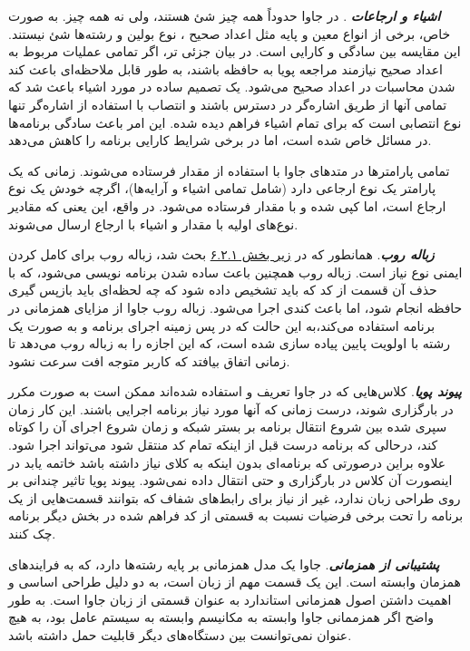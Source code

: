 \documentclass[a4paper,12pt]{report}
\begin{document}
	\textbf{\textit{
	اشیاء و ارجاعات
}}. در جاوا حدوداً همه چیز شئ هستند، ولی نه همه چیز. به صورت خاص، برخی از انواع معین و پایه مثل اعداد صحیح
، نوع بولین
 و رشته‌ها شئ نیستند. این مقایسه بین سادگی و کارایی است. در بیان جزئی تر، اگر تمامی عملیات مربوط به اعداد صحیح نیازمند مراجعه پویا به حافظه باشند، به طور قابل ملاحظه‌ای باعث کند شدن محاسبات در اعداد صحیح می‌شود. یک تصمیم ساده در مورد اشیاء باعث شد که تمامی آنها از طریق اشاره‌گر در دسترس باشند و انتصاب با استفاده از اشاره‌گر تنها نوع انتصابی است که برای تمام اشیاء فراهم دیده شده. این امر باعث سادگی برنامه‌ها در مسائل خاص شده است، اما در برخی شرایط کارایی برنامه را کاهش می‌دهد.

تمامی پارامترها در متدهای جاوا با استفاده از مقدار فرستاده می‌شوند. زمانی که یک پارامتر یک نوع ارجاعی دارد (شامل تمامی اشیاء و آرایه‌ها)، اگرچه خودش یک نوع ارجاع است، اما کپی شده و با مقدار فرستاده می‌شود. در واقع، این یعنی که مقادیر نوع‌های اولیه با مقدار و اشیاء با ارجاع ارسال می‌شوند.
	
	
	\textbf{\textit{
	زباله روب}}. همانطور که در 
	\hyperref[subsec1:sec2:chap6]{
	زیر بخش ۶.۲.۱} بحث شد، زباله روب برای کامل کردن ایمنی نوع  نیاز است. زباله روب همچنین باعث ساده شدن برنامه نویسی می‌شود، که با حذف آن قسمت از کد که باید تشخیص داده شود که چه لحظه‌ای باید بازپس گیری حافظه انجام شود، اما باعث کندی اجرا می‌شود. 
	زباله روب جاوا از مزایای همزمانی در برنامه استفاده می‌کند،‌به این حالت که در پس زمینه اجرای برنامه و به صورت یک رشته با اولویت پایین پیاده سازی شده است، که این اجازه را به زباله روب می‌دهد تا زمانی اتفاق بیافتد که کاربر متوجه افت سرعت نشود.
	
	\textbf{\textit{
	پیوند پویا}}. 
	کلاس‌هایی که در جاوا تعریف و استفاده شده‌اند ممکن است به صورت مکرر در 
	بارگزاری شوند،‌ درست زمانی که آنها مورد نیاز برنامه اجرایی باشند. این کار زمان سپری شده بین شروع انتقال برنامه بر بستر شبکه و زمان شروع اجرای آن را کوتاه کند،‌ درحالی که برنامه درست قبل از اینکه تمام کد منتقل شود می‌تواند اجرا شود. علاوه براین درصورتی که برنامه‌ای بدون اینکه به کلای نیاز داشته باشد خاتمه یابد در اینصورت آن کلاس در 
	 بارگزاری و حتی انتقال داده نمی‌شود. پیوند پویا تاثیر چندانی بر روی طراحی زبان ندارد، غیر از نیاز برای رابط‌های شفاف که بتوانند قسمت‌هایی از یک برنامه را تحت برخی فرضیات نسبت به قسمتی از کد فراهم شده در بخش دیگر برنامه چک کنند.
	
	
	\textbf{\textit{
	پشتیبانی از همزمانی}}. جاوا یک مدل همزمانی بر پایه رشته‌ها
 دارد، که به فرایندهای همزمان وابسته است. این یک قسمت مهم از زبان است، به دو دلیل طراحی اساسی و اهمیت داشتن اصول همزمانی استاندارد به عنوان قسمتی از زبان جاوا است. به طور واضح اگر همزممانی جاوا وابسته به مکانیسم وابسته به سیستم عامل بود، به هیچ عنوان نمی‌توانست بین دستگاه‌های دیگر قابلیت حمل داشته باشد.
 
\end{document}
